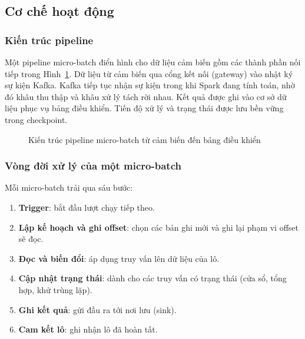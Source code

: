 \subsection{Cơ chế hoạt động}
\label{sec:2-mechanism}

\subsubsection{Kiến trúc pipeline}
\label{sec:2-pipeline}

Một pipeline micro-batch điển hình cho dữ liệu cảm biến gồm các thành phần nối tiếp trong Hình~\ref{fig:2-pipeline}. Dữ liệu từ cảm biến qua cổng kết nối (gateway) vào nhật ký sự kiện Kafka. Kafka tiếp tục nhận sự kiện trong khi Spark đang tính toán, nhờ đó khâu thu thập và khâu xử lý tách rời nhau. Kết quả được ghi vào cơ sở dữ liệu phục vụ bảng điều khiển. Tiến độ xử lý và trạng thái được lưu bền vững trong checkpoint.

\begin{figure}[H]
\centering
{}
\caption{Kiến trúc pipeline micro-batch từ cảm biến đến bảng điều khiển}
\label{fig:2-pipeline}
\end{figure}

\subsubsection{Vòng đời xử lý của một micro-batch}
\label{sec:2-lifecycle}

Mỗi micro-batch trải qua sáu bước:
\begin{enumerate}
  \item \textbf{Trigger}: bắt đầu lượt chạy tiếp theo.
  \item \textbf{Lập kế hoạch và ghi offset}: chọn các bản ghi mới và ghi lại phạm vi offset sẽ đọc.
  \item \textbf{Đọc và biến đổi}: áp dụng truy vấn lên dữ liệu của lô.
  \item \textbf{Cập nhật trạng thái}: dành cho các truy vấn có trạng thái (cửa sổ, tổng hợp, khử trùng lặp).
  \item \textbf{Ghi kết quả}: gửi đầu ra tới nơi lưu (sink).
  \item \textbf{Cam kết lô}: ghi nhận lô đã hoàn tất.
\end{enumerate}

